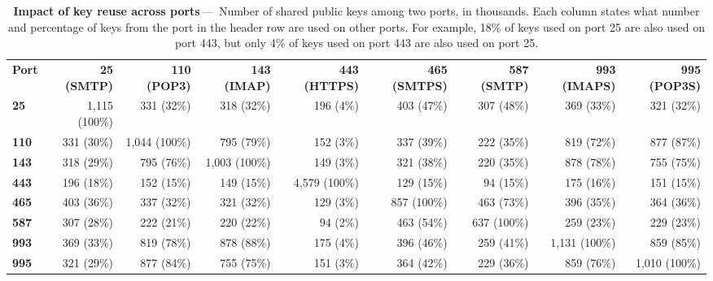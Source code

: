 \begin{landscape}
\begin{table*}[t]
\centering\footnotesize
\begin{tabularx}{\linewidth}{Xrrrrrrrr} 
\toprule

\textbf{Port} & \textbf{25 (SMTP)} & \textbf{110 (POP3)} & \textbf{143 (IMAP)} & \textbf{443 (HTTPS)} & \textbf{465 (SMTPS)} & \textbf{587 (SMTP)} & \textbf{993 (IMAPS)} & \textbf{995 (POP3S)}\smallskip\\
\textbf{ 25} &  1,115 (100\%) &          331 (32\%) &       318 (32\%) &       196 (4\%) &        403 (47\%) &       307 (48\%) &       369 (33\%) &       321 (32\%) \\
\textbf{110} &    331 (30\%) &         1,044 (100\%) &      795 (79\%) &       152 (3\%) &        337 (39\%) &       222 (35\%) &       819 (72\%) &       877 (87\%) \\
\textbf{143} &    318 (29\%) &           795 (76\%) &     1,003 (100\%) &      149 (3\%) &        321 (38\%) &       220 (35\%) &       878 (78\%) &       755 (75\%) \\
\textbf{443} &    196 (18\%) &           152 (15\%) &       149 (15\%) &     4,579 (100\%) &      129 (15\%) &        94 (15\%) &       175 (16\%) &       151 (15\%) \\
\textbf{465} &    403 (36\%) &           337 (32\%) &       321 (32\%) &       129 (3\%) &        857 (100\%) &      463 (73\%) &       396 (35\%) &       364 (36\%) \\
\textbf{587} &    307 (28\%) &           222 (21\%) &       220 (22\%) &        94 (2\%) &        463 (54\%) &       637 (100\%) &      259 (23\%) &       229 (23\%) \\
\textbf{993} &    369 (33\%) &           819 (78\%) &       878 (88\%) &       175 (4\%) &        396 (46\%) &       259 (41\%) &     1,131 (100\%) &      859 (85\%) \\
\textbf{995} &    321 (29\%) &           877 (84\%) &       755 (75\%) &       151 (3\%) &        364 (42\%) &       229 (36\%) &       859 (76\%) &     1,010 (100\%) \\

\bottomrule
\end{tabularx}
\caption{\textbf{Impact of key reuse across ports}\,---\,%
   Number of shared public keys among two ports, in thousands. Each column
   states what number and percentage of keys from the port in the header row
   are used on other ports. For example, 18\% of keys used on port 25 are
   also used on port 443, but only 4\% of keys used on port 443 are also
   used on port 25.
}
\label{amount_shared_keys}
\end{table*}
\end{landscape}

